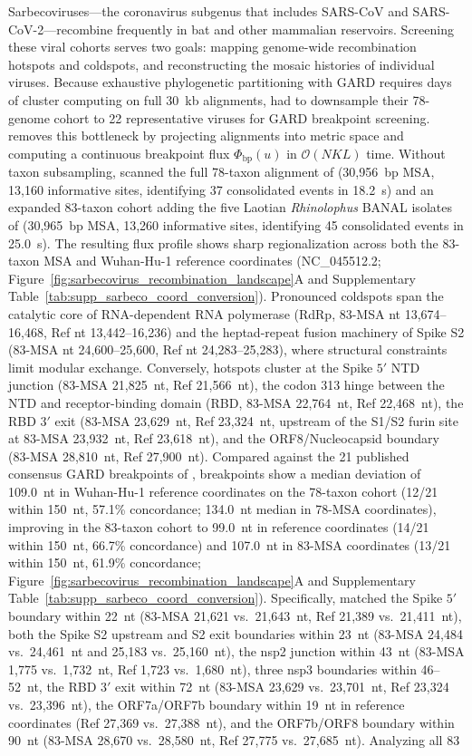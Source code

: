 Sarbecoviruses—the coronavirus subgenus that includes SARS-CoV and SARS-CoV-2—recombine frequently in bat and other mammalian reservoirs. Screening these viral cohorts serves two goals: mapping genome-wide recombination hotspots and coldspots, and reconstructing the mosaic histories of individual viruses. Because exhaustive phylogenetic partitioning with GARD requires days of cluster computing on full 30~kb alignments, \citet{lytras2022exploring} had to downsample their 78-genome cohort to 22 representative viruses for GARD breakpoint screening. \RhizAeon removes this bottleneck by projecting alignments into metric space and computing a continuous breakpoint flux $\Phi_{\mathrm{bp}}(u)$ in $\mathcal{O}(N K L)$ time. Without taxon subsampling, \RhizAeon scanned the full 78-taxon alignment of \citet{lytras2022exploring} (30,956~bp MSA, 13,160 informative sites, identifying 37 consolidated events in 18.2~s) and an expanded 83-taxon cohort adding the five Laotian \textit{Rhinolophus} BANAL isolates of \citet{temmam2022bat} (30,965~bp MSA, 13,260 informative sites, identifying 45 consolidated events in 25.0~s). The resulting flux profile shows sharp regionalization across both the 83-taxon MSA and Wuhan-Hu-1 reference coordinates (NC\_045512.2; Figure~\ref{fig:sarbecovirus_recombination_landscape}A and Supplementary Table~\ref{tab:supp_sarbeco_coord_conversion}). Pronounced coldspots span the catalytic core of RNA-dependent RNA polymerase (RdRp, 83-MSA nt 13,674--16,468, Ref nt 13,442--16,236) and the heptad-repeat fusion machinery of Spike S2 (83-MSA nt 24,600--25,600, Ref nt 24,283--25,283), where structural constraints limit modular exchange. Conversely, hotspots cluster at the Spike $5'$ NTD junction (83-MSA 21,825~nt, Ref 21,566~nt), the codon 313 hinge between the NTD and receptor-binding domain (RBD, 83-MSA 22,764~nt, Ref 22,468~nt), the RBD $3'$ exit (83-MSA 23,629~nt, Ref 23,324~nt, upstream of the S1/S2 furin site at 83-MSA 23,932~nt, Ref 23,618~nt), and the ORF8/Nucleocapsid boundary (83-MSA 28,810~nt, Ref 27,900~nt). Compared against the 21 published consensus GARD breakpoints of \citet{lytras2022exploring}, \RhizAeon breakpoints show a median deviation of 109.0~nt in Wuhan-Hu-1 reference coordinates on the 78-taxon cohort (12/21 within 150~nt, 57.1\% concordance; 134.0~nt median in 78-MSA coordinates), improving in the 83-taxon cohort to 99.0~nt in reference coordinates (14/21 within 150~nt, 66.7\% concordance) and 107.0~nt in 83-MSA coordinates (13/21 within 150~nt, 61.9\% concordance; Figure~\ref{fig:sarbecovirus_recombination_landscape}A and Supplementary Table~\ref{tab:supp_sarbeco_coord_conversion}). Specifically, \RhizAeon matched the Spike $5'$ boundary within 22~nt (83-MSA 21,621 vs.\ 21,643~nt, Ref 21,389 vs.\ 21,411~nt), both the Spike S2 upstream and S2 exit boundaries within 23~nt (83-MSA 24,484 vs.\ 24,461~nt and 25,183 vs.\ 25,160~nt), the nsp2 junction within 43~nt (83-MSA 1,775 vs.\ 1,732~nt, Ref 1,723 vs.\ 1,680~nt), three nsp3 boundaries within 46--52~nt, the RBD $3'$ exit within 72~nt (83-MSA 23,629 vs.\ 23,701~nt, Ref 23,324 vs.\ 23,396~nt), the ORF7a/ORF7b boundary within 19~nt in reference coordinates (Ref 27,369 vs.\ 27,388~nt), and the ORF7b/ORF8 boundary within 90~nt (83-MSA 28,670 vs.\ 28,580~nt, Ref 27,775 vs.\ 27,685~nt). Analyzing all 83 